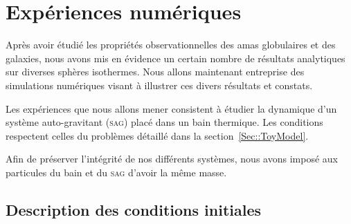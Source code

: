 \chapter{Expériences numériques}
	\minitoc


Après avoir étudié les propriétés observationnelles des amas globulaires et des galaxies, nous avons mis en évidence un certain nombre
de résultats analytiques sur diverses sphères isothermes. Nous allons maintenant entreprise des simulations numériques visant
à illustrer ces divers résultats et constats.

Les expériences que nous allons mener consistent à étudier la dynamique d'un système auto-gravitant (\textsc{sag}) placé
dans un bain thermique. Les conditions respectent celles du problèmes détaillé dans la section~\ref{Sec::ToyModel}.


Afin de préserver l'intégrité de nos différents systèmes, nous avons imposé aux particules du bain et du \textsc{sag} d'avoir la
même masse.

\section{Description des conditions initiales}


